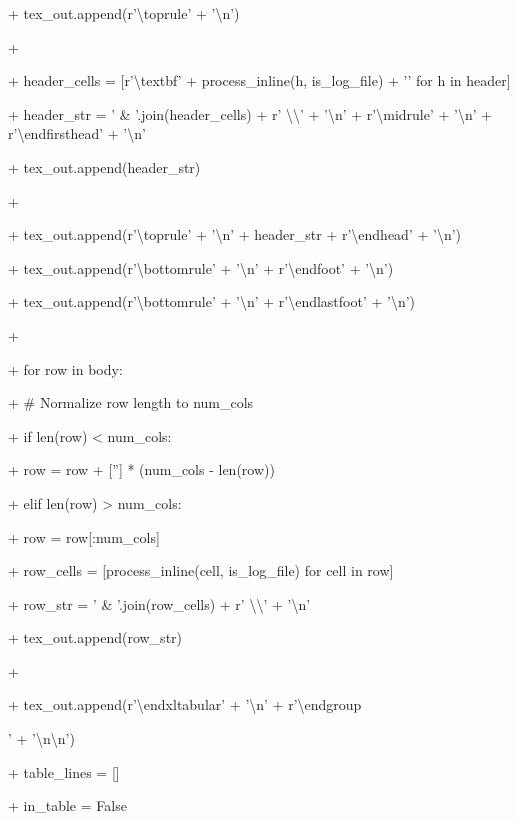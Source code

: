 \documentclass[11pt,a4paper]{article}
\begin{document}
\begin{itemize}
{+                    tex\_out.append(r'\textbackslash{}toprule' + '\textbackslash{}n')

+

+                    header\_cells = [r'\textbackslash{}textbf{' + process\_inline(h, is\_log\_file) + '}' for h in header]

+                    header\_str = ' \& '.join(header\_cells) + r' \textbackslash{}\textbackslash{}' + '\textbackslash{}n' + r'\textbackslash{}midrule' + '\textbackslash{}n' + r'\textbackslash{}endfirsthead' + '\textbackslash{}n'

+                    tex\_out.append(header\_str)

+

+                    tex\_out.append(r'\textbackslash{}toprule' + '\textbackslash{}n' + header\_str + r'\textbackslash{}endhead' + '\textbackslash{}n')

+                    tex\_out.append(r'\textbackslash{}bottomrule' + '\textbackslash{}n' + r'\textbackslash{}endfoot' + '\textbackslash{}n')

+                    tex\_out.append(r'\textbackslash{}bottomrule' + '\textbackslash{}n' + r'\textbackslash{}endlastfoot' + '\textbackslash{}n')

+

+                    for row in body:

+                        \# Normalize row length to num\_cols

+                        if len(row) < num\_cols:

+                            row = row + [''] * (num\_cols - len(row))

+                        elif len(row) > num\_cols:

+                            row = row[:num\_cols]

+                        row\_cells = [process\_inline(cell, is\_log\_file) for cell in row]

+                        row\_str = ' \& '.join(row\_cells) + r' \textbackslash{}\textbackslash{}' + '\textbackslash{}n'

+                        tex\_out.append(row\_str)

+

+                    tex\_out.append(r'\textbackslash{}end{xltabular}' + '\textbackslash{}n' + r'\textbackslash{}endgroup}' + '\textbackslash{}n\textbackslash{}n')

+                    table\_lines = []

+                    in\_table = False

\end{itemize}
\end{document}
